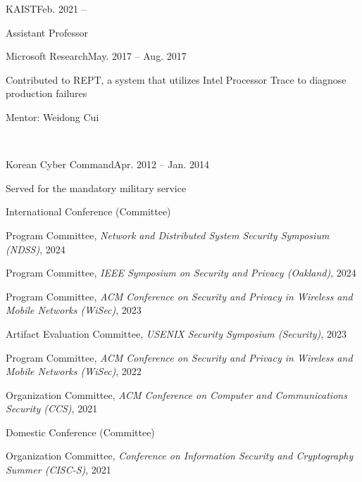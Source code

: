 \documentclass[11pt,letterpaper]{article}
\begin{document}
%
%

\begin{topic}{KAIST}{Feb. 2021 --}
\item Assistant Professor
\end{topic}
\begin{topic}{Microsoft Research}{May. 2017 -- Aug. 2017}
\item Contributed to REPT, a system that utilizes Intel Processor Trace to diagnose production failures
  \item Mentor:  Weidong Cui
\end{topic}
 \\
\begin{topic}{Korean Cyber Command}{Apr. 2012 -- Jan. 2014}
  \item Served for the mandatory military service
\end{topic}

\begin{topic}{International Conference (Committee)}{}
  \item{Program Committee, \emph{Network and Distributed System Security Symposium (NDSS)}, 2024}
  \item{Program Committee, \emph{IEEE Symposium on Security and Privacy (Oakland)}, 2024}
  \item{Program Committee, \emph{ACM Conference on Security and Privacy in Wireless and Mobile Networks (WiSec)}, 2023}
  \item{Artifact Evaluation Committee, \emph{USENIX Security Symposium (Security)}, 2023}
  \item{Program Committee, \emph{ACM Conference on Security and Privacy in Wireless and Mobile Networks (WiSec)}, 2022}
  \item{Organization Committee, \emph{ACM Conference on Computer and Communications Security (CCS)}, 2021}
\end{topic}

\begin{topic}{Domestic Conference (Committee)}{}
  \item{Organization Committee, \emph{Conference on Information Security and Cryptography Summer (CISC-S)}, 2021}
\end{topic}
\end{document}
